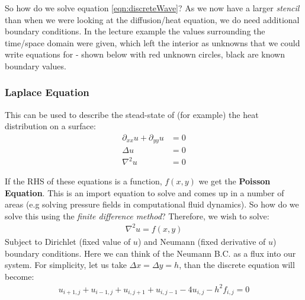 \documentclass[11pt,a4paper]{report}
\begin{document}
			So how do we solve equation \ref{eqn:discreteWave}? As we now have a larger \textit{stencil} than when we were looking at the diffusion/heat equation, we do need additional boundary conditions. In the lecture example the values surrounding the time/space domain were given, which left the interior as unknowns that we could write equations for - shown below with red unknown circles, black are known boundary values.
			\begin{figure}[h!]
				\centering
			\end{figure}
		
		\subsubsection{Laplace Equation}
			This can be used to describe the stead-state of (for example) the heat distribution on a surface:
			\begin{align}
			\partial_{xx} u + \partial_{yy} u &= 0 \\
			\Delta u &= 0 \\
			\nabla^2 u &= 0 
			\end{align}
			
			If the RHS of these equations is a function, $f(x,y)$ we get the \textbf{Poisson Equation}. This is an import equation to solve and comes up in a number of areas (e.g solving pressure fields in computational fluid dynamics). So how do we solve this using the \textit{finite difference method}? Therefore, we wish to solve:
			\begin{align}
			\nabla^2 u = f(x,y)
			\end{align}
			Subject to Dirichlet (fixed value of $u$) and Neumann (fixed derivative of $u$) boundary conditions. Here we can think of the Neumann B.C. as a flux into our system. For simplicity, let us take $\Delta x = \Delta y = h$, than the discrete equation will become:
			\begin{align}
			u_{i+1,j} + u_{i-1,j} + u_{i,j+1} + u_{i,j-1} - 4u_{i,j} - h^2 f_{i,j} = 0 \label{eqn:laplaceDiscrete}
			\end{align}
			
\end{document}
